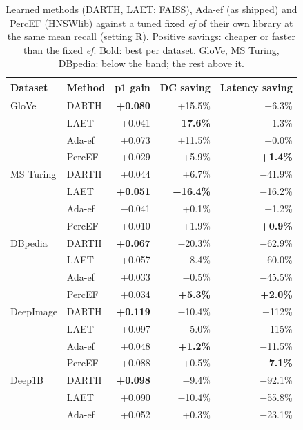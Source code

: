 \documentclass[sigconf,anonymous]{acmart}
\newcommand{\ef}{\textit{ef}}
\begin{document}
\begin{table}[t]
  \caption{Learned methods (DARTH, LAET; FAISS), Ada-ef (as shipped) and PercEF (HNSWlib) against a
  tuned fixed \ef{} of their own library at the same mean recall (setting R). Positive savings:
  cheaper or faster than the fixed \ef{}. Bold: best per dataset. GloVe, MS Turing, DBpedia: below
  the band; the rest above it.}
  \label{tab:darth}
  \centering\footnotesize
  \begin{tabular}{llrrr}
    \toprule
    Dataset & Method & p1 gain & DC saving & Latency saving \\
    \midrule
    GloVe         & DARTH  & \textbf{+0.080} & +15.5\% & $-$6.3\% \\
                  & LAET   & +0.041 & \textbf{+17.6\%} & +1.3\% \\
                  & Ada-ef & +0.073 & +11.5\% & +0.0\% \\
                  & PercEF & +0.029 & +5.9\% & \textbf{+1.4\%} \\
    \midrule
    MS Turing     & DARTH  & +0.044 & +6.7\% & $-$41.9\% \\
                  & LAET   & \textbf{+0.051} & \textbf{+16.4\%} & $-$16.2\% \\
                  & Ada-ef & $-$0.041 & +0.1\% & $-$1.2\% \\
                  & PercEF & +0.010 & +1.9\% & \textbf{+0.9\%} \\
    \midrule
    DBpedia       & DARTH  & \textbf{+0.067} & $-$20.3\% & $-$62.9\% \\
                  & LAET   & +0.057 & $-$8.4\% & $-$60.0\% \\
                  & Ada-ef & +0.033 & $-$0.5\% & $-$45.5\% \\
                  & PercEF & +0.034 & \textbf{+5.3\%} & \textbf{+2.0\%} \\
    \midrule
    DeepImage     & DARTH  & \textbf{+0.119} & $-$10.4\% & $-$112\% \\
                  & LAET   & +0.097 & $-$5.0\% & $-$115\% \\
                  & Ada-ef & +0.048 & \textbf{+1.2\%} & $-$11.5\% \\
                  & PercEF & +0.088 & +0.5\% & \textbf{$-$7.1\%} \\
    \midrule
    Deep1B        & DARTH  & \textbf{+0.098} & $-$9.4\% & $-$92.1\% \\
                  & LAET   & +0.090 & $-$10.4\% & $-$55.8\% \\
                  & Ada-ef & +0.052 & +0.3\% & $-$23.1\% \\

\end{tabular}
\end{table}
\end{document}
